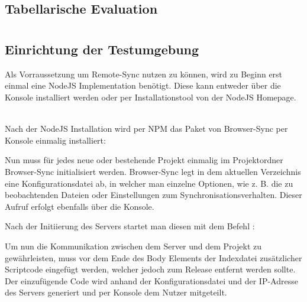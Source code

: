 				
		\subsection{Tabellarische Evaluation}
		
	
\pagebreak
	\section{}	
	\subsection{Einrichtung der Testumgebung}
	Als Vorraussetzung um Remote-Sync nutzen zu können, wird zu Beginn erst einmal eine NodeJS Implementation benötigt. Diese kann entweder über die Konsole installiert werden oder per Installationstool von der NodeJS Homepage.
	
	\\Nach der NodeJS Installation wird per NPM das Paket von Browser-Sync per Konsole einmalig installiert:
	
	Nun muss für jedes neue oder bestehende Projekt einmalig im Projektordner Browser-Sync initialisiert werden. Browser-Sync legt in dem aktuellen Verzeichnis eine Konfigurationsdatei ab, in welcher man einzelne Optionen, wie z. B. die zu beobachtenden Dateien oder Einstellungen zum Synchronisationsverhalten. Dieser Aufruf erfolgt ebenfalls über die Konsole.
	
	Nach der Initiierung des Servers startet man diesen mit dem Befehl :
	
	Um nun die Kommunikation zwischen dem Server und dem Projekt zu gewährleisten, muss vor dem Ende des Body Elements der Indexdatei zusätzlicher Scriptcode eingefügt werden, welcher jedoch zum Release entfernt werden sollte. Der einzufügende Code  wird anhand der Konfigurationsdatei und der IP-Adresse des Servers generiert und per Konsole dem Nutzer mitgeteilt.
	
